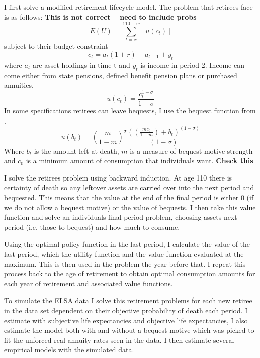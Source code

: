 \documentclass[12pt]{article}
\begin{document}
I first solve a modified retirement lifecycle model. The problem that retirees face is as follows:
\textbf{This is not correct -- need to include probs}
\begin{equation*}
      E(U) = \sum_{t = x}^{110 - w}[u(c_{t})]
\end{equation*}
subject to their budget constraint
\begin{equation*}
      c_{t} =a_{t}(1 +r) -  a_{t+1} + y_{t}
\end{equation*}
where $a_{t}$ are asset holdings in time t and $y_{t}$ is income in period 2. Income can come either
from state pensions, defined benefit pension plans or purchased annuities.
\begin{equation*}
      u(c_{t}) = \frac{c_{t}^{1 - \sigma}}{1 - \sigma}
\end{equation*} In some specifications retirees can leave bequests, I use the bequest function from
\cite{lockwood_red_2012}.
\begin{equation*}
      u(b_{t}) = (\frac{m}{1 - m})^{\sigma}  \frac{((\frac{m c_{0}}{1 - m}) + b_{t})^(1 - \sigma)}{(1 - \sigma)}
\end{equation*}
Where $b_{t}$ is the amount left at death, $m$ is a measure of bequest motive strength and $c_{0}$ is
a minimum amount of consumption that individuals want. \textbf{Check this}

I solve the retirees problem using backward induction. At age 110 there is certainty of death so any leftover assets
are carried over into the next period and bequested. This means that the value at the end of the final period is
either 0 (if we do not allow a bequest motive) or the value of bequests. I then take this value function and solve
an individuals final period problem, choosing assets next period (i.e. those to bequest) and how much to consume.

Using the optimal policy function in the last period, I calculate the value of the last period, which the utility
function and the value function evaluated at the maximum. This is then used in the problem the year before that.
I repeat this process back to the age of retirement to obtain optimal consumption amounts for each year of retirement
and associated value functions.

To simulate the ELSA data I solve this retirement problems for each new retiree in the data set dependent on their
objective probability of death each period. I estimate with subjective life expectancies and objective life expectancies,
I also estimate the model both with and without a bequest motive which was picked to fit the unforced real annuity
rates seen in the data. I then estimate several empirical models with the simulated data.
\end{document}
